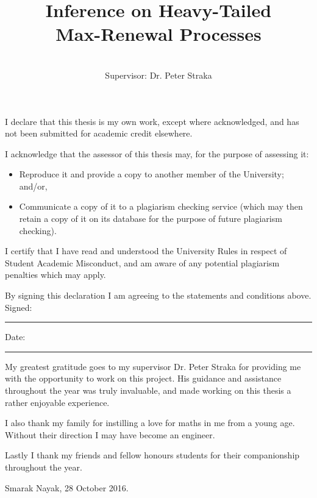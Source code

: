 \documentclass[honours,12pt,twoside, openright]{unswthesis}
\title{Inference on Heavy-Tailed\\ Max-Renewal Processes}
\author{\Authornameonly\\{\bigskip}Supervisor: Dr. Peter Straka}
\newcommand{\1}{\mathbf 1}
\newcommand\blankpage{%
    \null
    \thispagestyle{empty}%
    \addtocounter{page}{-1}%
    \newpage}
\numberwithin{equation}{section}
\theoremstyle{definition}
\theoremstyle{remark}
\begin{document}
\beforepreface

\afterpage{\blankpage}



\vskip 10pc \noindent I declare that this thesis is my
own work, except where acknowledged, and has not been submitted for
academic credit elsewhere. 

\vskip 2pc  \noindent I acknowledge that the assessor of this
thesis may, for the purpose of assessing it:
\begin{itemize}
\item Reproduce it and provide a copy to another member of the University; and/or,
\item Communicate a copy of it to a plagiarism checking service (which may then retain a copy of it on its database for the purpose of future plagiarism checking).
\end{itemize}

\vskip 2pc \noindent I certify that I have read and understood the University Rules in
respect of Student Academic Misconduct, and am aware of any potential plagiarism penalties which may 
apply.\vspace{24pt}

\vskip 2pc \noindent By signing 
this declaration I am
agreeing to the statements and conditions above.
\vskip 2pc \noindent
Signed: \rule{7cm}{0.25pt} \hfill Date: \rule{4cm}{0.25pt} \newline
\vskip 1pc

\afterpage{\blankpage}




{\bigskip}My greatest gratitude goes to my supervisor Dr. Peter Straka for providing me with the opportunity to work on this project. His guidance and assistance throughout the year was truly invaluable, and made working on this thesis a rather enjoyable experience.

{\bigskip\noindent}I also thank my family for instilling a love for maths in me from a young age. Without their direction I may have become an engineer.

{\bigskip\noindent}Lastly I thank my friends and fellow honours students for their companionship throughout the year.



{\bigskip\bigskip\bigskip\noindent}Smarak Nayak, 28 October 2016.
\end{document}
